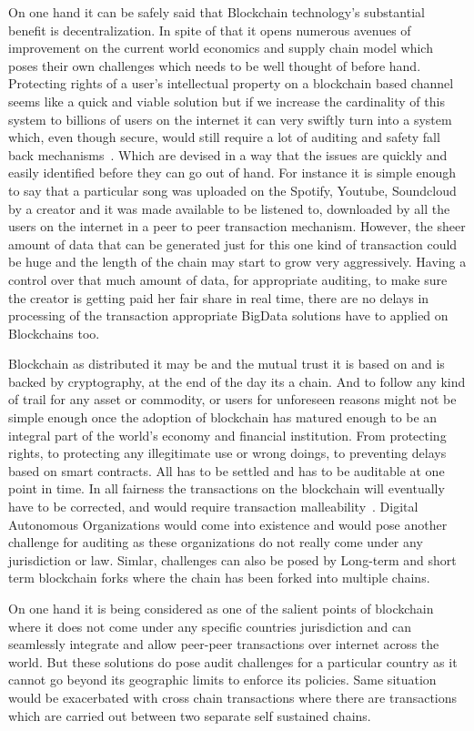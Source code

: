 On one hand it can be safely said that Blockchain technology's
substantial benefit is decentralization. In spite of that it opens
numerous avenues of improvement on the current world economics and
supply chain model which poses their own challenges which needs to be
well thought of before hand. Protecting rights of a user's
intellectual property on a blockchain based channel seems like a quick
and viable solution but if we increase the cardinality of this system
to billions of users on the internet it can very swiftly turn into a
system which, even though secure, would still require a lot of
auditing and safety fall back mechanisms~\cite{smith31}. Which are
devised in a way that the issues are quickly and easily identified
before they can go out of hand. For instance it is simple enough to
say that a particular song was uploaded on the Spotify, Youtube,
Soundcloud by a creator and it was made available to be listened to,
downloaded by all the users on the internet in a peer to peer
transaction mechanism. However, the sheer amount of data that can be
generated just for this one kind of transaction could be huge and the
length of the chain may start to grow very aggressively. Having a
control over that much amount of data, for appropriate auditing, to
make sure the creator is getting paid her fair share in real time,
there are no delays in processing of the transaction appropriate
BigData solutions have to applied on Blockchains too.

Blockchain as distributed it may be and the mutual trust it is based on
and is backed by cryptography, at the end of the day its a chain. And
to follow any kind of trail for any asset or commodity, or users for
unforeseen reasons might not be simple enough once the adoption of
blockchain has matured enough to be an integral part of the world's
economy and financial institution. From protecting rights, to
protecting any illegitimate use or wrong doings, to preventing delays
based on smart contracts. All has to be settled and has to be
auditable at one point in time. In all fairness the transactions on
the blockchain will eventually have to be corrected, and would require
transaction malleability~\cite{daniel32}. Digital Autonomous
Organizations would come into existence and would pose
another challenge for auditing as these organizations do not really
come under any jurisdiction or law. Simlar, challenges can also be
posed by Long-term and short term blockchain forks where the chain has
been forked into multiple chains.

On one hand it is being considered as one of the salient points of
blockchain where it does not come under any specific countries
jurisdiction and can seamlessly integrate and allow peer-peer
transactions over internet across the world. But these solutions do
pose audit challenges for a particular country as it cannot go beyond
its geographic limits to enforce its policies. Same situation would be
exacerbated with cross chain transactions where there are transactions
which are carried out between two separate self sustained chains.

